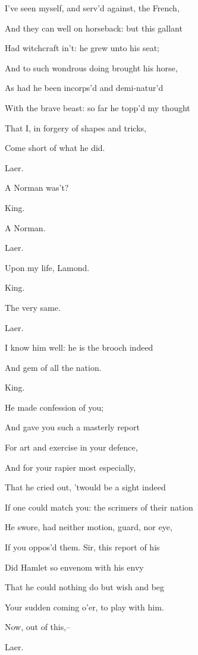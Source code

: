\documentclass[12pt]{book}
\begin{document}
I've seen myself, and serv'd against, the French,

And they can well on horseback: but this gallant

Had witchcraft in't: he grew unto his seat;

And to such wondrous doing brought his horse,

As had he been incorps'd and demi-natur'd

With the brave beast: so far he topp'd my thought

That I, in forgery of shapes and tricks,

Come short of what he did.



Laer.

A Norman was't?



King.

A Norman.



Laer.

Upon my life, Lamond.



King.

The very same.



Laer.

I know him well: he is the brooch indeed

And gem of all the nation.



King.

He made confession of you;

And gave you such a masterly report

For art and exercise in your defence,

And for your rapier most especially,

That he cried out, 'twould be a sight indeed

If one could match you: the scrimers of their nation

He swore, had neither motion, guard, nor eye,

If you oppos'd them. Sir, this report of his

Did Hamlet so envenom with his envy

That he could nothing do but wish and beg

Your sudden coming o'er, to play with him.

Now, out of this,--



Laer.
\end{document}
